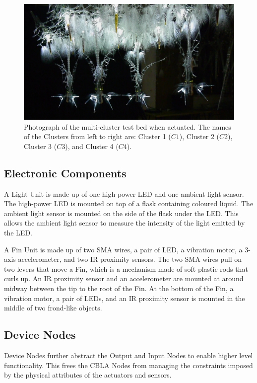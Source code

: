 \begin{figure} [!htb]
	\centering
	\includegraphics[width=1.0\textwidth]{"fig/validations/cbla-test-bed photo 2"}
	\caption[Photograph of the multi-cluster test bed]{Photograph of the multi-cluster test bed when actuated. The names of the Clusters from left to right are: Cluster 1 ($C1$), Cluster 2 ($C2$), Cluster 3 ($C3$), and Cluster 4 ($C4$).}
	\label{fig:cbla-test-bed photo 2}
\end{figure}


\subsection{Electronic Components}

A Light Unit is made up of one high-power LED and one ambient light sensor. The high-power LED is mounted on top of a flask containing coloured liquid. The ambient light sensor is mounted on the side of the flask under the LED. This allows the ambient light sensor to measure the intensity of the light emitted by the LED. 

A Fin Unit is made up of two SMA wires, a pair of LED, a vibration motor, a 3-axis accelerometer, and two IR proximity sensors. The two SMA wires pull on two levers that move a Fin, which is a mechanism made of soft plastic rods that curls up. An IR proximity sensor and an accelerometer are mounted at around midway between the tip to the root of the Fin. At the bottom of the Fin, a vibration motor, a pair of LEDs, and an IR proximity sensor is mounted in the middle of two frond-like objects. 

\subsection{Device Nodes}

Device Nodes further abstract the Output and Input Nodes to enable higher level functionality. This frees the CBLA Nodes from managing the constraints imposed by the physical attributes of the actuators and sensors. 

